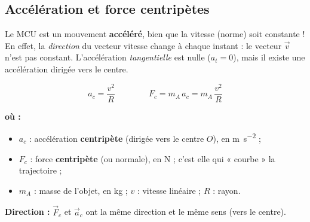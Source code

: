\documentclass[11pt,a4paper]{article}
\newenvironment{ou}{%
  \par\smallskip\noindent\textbf{où :}\nopagebreak
  \begin{itemize}[leftmargin=1.8em,topsep=2pt,itemsep=1.5pt,parsep=0pt]}%
  {\end{itemize}}
\newcommand{\vv}[1]{\vec{#1}}
\begin{document}
\subsection{Accélération et force centripètes}

\begin{attention}
Le MCU est un mouvement \textbf{accéléré}, bien que la vitesse (norme) soit constante ! En effet, la
\emph{direction} du vecteur vitesse change à chaque instant : le vecteur $\vv v$ n'est pas constant.
L'accélération \emph{tangentielle} est nulle ($a_t=0$), mais il existe une accélération dirigée vers
le centre.
\end{attention}

\begin{formule}
\[ \boxed{a_c=\frac{v^2}{R}}\qquad\qquad \boxed{F_c=m_A\,a_c=m_A\,\frac{v^2}{R}} \]
\begin{ou}
  \item $a_c$ : accélération \textbf{centripète} (dirigée vers le centre $O$), en \si{\metre\per\second\squared} ;
  \item $F_c$ : force \textbf{centripète} (ou normale), en \si{\newton} ; c'est elle qui « courbe » la trajectoire ;
  \item $m_A$ : masse de l'objet, en \si{\kilogram} ; \quad $v$ : vitesse linéaire ; \quad $R$ : rayon.
\end{ou}
\textbf{Direction :} $\vv F_c$ et $\vv a_c$ ont la même direction et le même sens (vers le centre).
\end{formule}

\begin{center}
\end{center}
\end{document}
